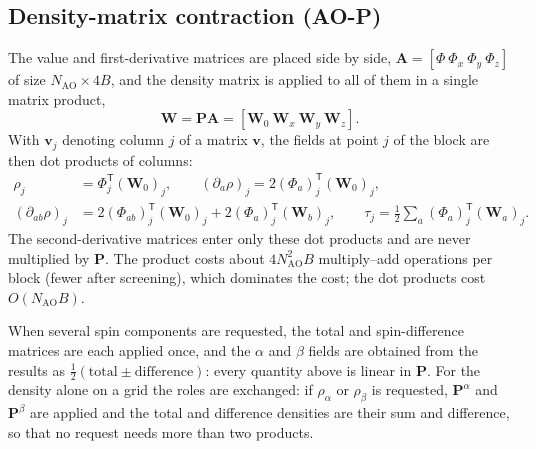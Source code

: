 \documentclass[11pt,a4paper]{article}
\begin{document}
\subsection{Density-matrix contraction (AO-P)}
The value and first-derivative matrices are placed side by side,
$\mathbf A=[\Phi\ \Phi_x\ \Phi_y\ \Phi_z]$ of size
$N_{\mathrm{AO}}\times4B$, and the density matrix is applied to all of them
in a single matrix product,
\begin{equation}
 \mathbf W=\mathbf P\mathbf A=[\mathbf W_0\ \mathbf W_x\ \mathbf W_y\ \mathbf W_z].
\end{equation}
With $\mathbf v_j$ denoting column $j$ of a matrix $\mathbf v$, the fields
at point $j$ of the block are then dot products of columns:
\begin{align}
 \rho_j&=\Phi_j^{\mathsf T}(\mathbf W_0)_j,\qquad
 (\partial_a\rho)_j=2(\Phi_a)_j^{\mathsf T}(\mathbf W_0)_j,\\
 (\partial_{ab}\rho)_j&=2(\Phi_{ab})_j^{\mathsf T}(\mathbf W_0)_j
                  +2(\Phi_a)_j^{\mathsf T}(\mathbf W_b)_j,\qquad
 \tau_j=\tfrac12\sum_a(\Phi_a)_j^{\mathsf T}(\mathbf W_a)_j.
\end{align}
The second-derivative matrices enter only these dot products and are never
multiplied by $\mathbf P$. The product costs about $4N_{\mathrm{AO}}^2B$
multiply--add operations per block (fewer after screening), which dominates
the cost; the dot products cost $O(N_{\mathrm{AO}}B)$.

When several spin components are requested, the total and spin-difference
matrices are each applied once, and the $\alpha$ and $\beta$ fields are
obtained from the results as $\frac12(\text{total}\pm\text{difference})$:
every quantity above is linear in $\mathbf P$. For the density alone on a
grid the roles are exchanged: if $\rho_\alpha$ or $\rho_\beta$ is
requested, $\mathbf P^\alpha$ and $\mathbf P^\beta$ are applied and the
total and difference densities are their sum and difference, so that no
request needs more than two products.
\end{document}
